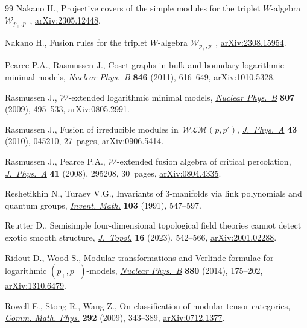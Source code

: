 \documentclass[pdftex]{sigma}
\numberwithin{equation}{section}
\theoremstyle{definition}
\begin{document}
\begin{thebibliography}{99}
Nakano H., Projective covers of the simple modules for the triplet
 $W$-algebra~$\mathcal{W}_{p_{+}, p_{-}}$,
 \href{http://arxiv.org/abs/2305.12448}{arXiv:2305.12448}.

Nakano H., Fusion rules for the triplet $W$-algebra $\mathcal{W}_{p_{+},
 p_{-}}$, \href{http://arxiv.org/abs/2308.15954}{arXiv:2308.15954}.

Pearce P.A., Rasmussen J., Coset graphs in bulk and boundary logarithmic
 minimal models,
 \href{https://doi.org/10.1016/j.nuclphysb.2011.01.014}{\textit{Nuclear
 Phys.~B}} \textbf{846} (2011), 616--649,
 \href{http://arxiv.org/abs/1010.5328}{arXiv:1010.5328}.

Rasmussen J., {$\mathcal{W}$}-extended logarithmic minimal models,
 \href{https://doi.org/10.1016/j.nuclphysb.2008.07.029}{\textit{Nuclear
 Phys.~B}} \textbf{807} (2009), 495--533,
 \href{http://arxiv.org/abs/0805.2991}{arXiv:0805.2991}.

Rasmussen J., Fusion of irreducible modules in~{$\mathcal{WLM}(p,p')$},
 \href{https://doi.org/10.1088/1751-8113/43/4/045210}{\textit{J.~Phys.~A}}
 \textbf{43} (2010), 045210, 27~pages,
 \href{http://arxiv.org/abs/0906.5414}{arXiv:0906.5414}.

Rasmussen J., Pearce P.A., {$\mathcal{W}$}-extended fusion algebra of critical
 percolation,
 \href{https://doi.org/10.1088/1751-8113/41/29/295208}{\textit{J.~Phys.~A}}
 \textbf{41} (2008), 295208, 30~pages,
 \href{http://arxiv.org/abs/0804.4335}{arXiv:0804.4335}.

Reshetikhin N., Turaev V.G., Invariants of {$3$}-manifolds via link polynomials
 and quantum groups, \href{https://doi.org/10.1007/BF01239527}{\textit{Invent.
 Math.}} \textbf{103} (1991), 547--597.

Reutter D., Semisimple four-dimensional topological field theories cannot
 detect exotic smooth structure,
 \href{https://doi.org/10.1112/topo.12288}{\textit{J.~Topol.}} \textbf{16}
 (2023), 542--566, \href{http://arxiv.org/abs/2001.02288}{arXiv:2001.02288}.

Ridout D., Wood S., Modular transformations and {V}erlinde formulae for
 logarithmic {$(p_+,p_-)$}-models,
 \href{https://doi.org/10.1016/j.nuclphysb.2014.01.010}{\textit{Nuclear
 Phys.~B}} \textbf{880} (2014), 175--202,
 \href{http://arxiv.org/abs/1310.6479}{arXiv:1310.6479}.

Rowell E., Stong R., Wang Z., On classification of modular tensor categories,
 \href{https://doi.org/10.1007/s00220-009-0908-z}{\textit{Comm. Math. Phys.}}
 \textbf{292} (2009), 343--389,
 \href{http://arxiv.org/abs/0712.1377}{arXiv:0712.1377}.


\end{thebibliography}
\end{document}
